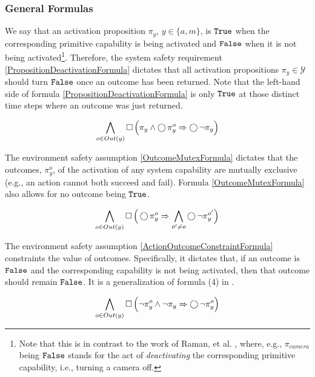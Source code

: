 \subsubsection{General Formulas}

We say that an activation proposition $\pi_y$, $y \in \{a, m\}$, is $\mathtt{True}$ when the corresponding primitive capability is being activated and $\mathtt{False}$ when it is not being activated\footnote{Note that this is in contrast to the work of Raman, et al. \cite{Vasu2013ICRA}, where, e.g., $\pi_{camera}$ being $\mathtt{False}$ stands for the act of \emph{deactivating} the corresponding primitive capability, i.e., turning a camera off.}.
Therefore, the system safety requirement \eqref{PropositionDeactivationFormula} dictates that all activation propositions $\pi_y \in \mathcal{Y}$ should turn $\mathtt{False}$ once an outcome has been returned.
Note that the left-hand side of formula \eqref{PropositionDeactivationFormula} is only $\mathtt{True}$ at those distinct time steps where an outcome was just returned.

\begin{equation}\label{PropositionDeactivationFormula}
	\bigwedge \limits_{o \in Out(y)} \operatorname{\Box} \Big( \pi_y \wedge \operatorname{\bigcirc} \pi_y^o \Rightarrow \operatorname{\bigcirc} \lnot \pi_y \Big)
\end{equation}

The environment safety assumption \eqref{OutcomeMutexFormula} dictates that the outcomes, $\pi_y^o$, of the activation of any system capability are mutually exclusive (e.g., an action cannot both succeed and fail).
Formula \eqref{OutcomeMutexFormula} also allows for no outcome being $\mathtt{True}$.

\begin{equation}\label{OutcomeMutexFormula}
	\bigwedge \limits_{o \in Out(y)} \operatorname{\Box} \Big( \operatorname{\bigcirc} \pi_y^o \Rightarrow \bigwedge \limits_{o^\prime \neq o} \operatorname{\bigcirc} \lnot \pi_y^{o^\prime} \Big)
\end{equation}

The environment safety assumption \eqref{ActionOutcomeConstraintFormula} constraints the value of outcomes.
Specifically, it dictates that, if an outcome is $\mathtt{False}$ and the corresponding capability is not being activated, then that outcome should remain $\mathtt{False}$.
It is a generalization of formula (4) in \cite{Vasu2013ICRA}.

\begin{equation}\label{ActionOutcomeConstraintFormula}
	\bigwedge \limits_{o \in Out(y)} \operatorname{\Box} \Big( \lnot \pi_y^o \wedge \lnot \pi_y \Rightarrow \operatorname{\bigcirc} \lnot \pi_y^o \Big)
\end{equation}

